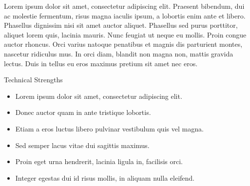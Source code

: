 \documentclass{resume}
\begin{document}
Lorem ipsum dolor sit amet, consectetur adipiscing elit. Praesent bibendum, dui ac molestie fermentum, risus magna iaculis ipsum, a lobortis enim ante et libero. Phasellus dignissim nisi sit amet auctor aliquet. Phasellus sed purus porttitor, aliquet lorem quis, lacinia mauris. Nunc feugiat ut neque eu mollis. Proin congue auctor rhoncus. Orci varius natoque penatibus et magnis dis parturient montes, nascetur ridiculus mus. In orci diam, blandit non magna non, mattis gravida lectus. Duis in tellus eu eros maximus pretium sit amet nec eros.

\begin{rSection}{Technical Strengths}
\begin{itemize}
\item Lorem ipsum dolor sit amet, consectetur adipiscing elit.
\item Donec auctor quam in ante tristique lobortis.
\item Etiam a eros luctus libero pulvinar vestibulum quis vel magna.
\item Sed semper lacus vitae dui sagittis maximus.
\item Proin eget urna hendrerit, lacinia ligula in, facilisis orci.
\item Integer egestas dui id risus mollis, in aliquam nulla eleifend.
\end{itemize}
\end{rSection}
\end{document}
